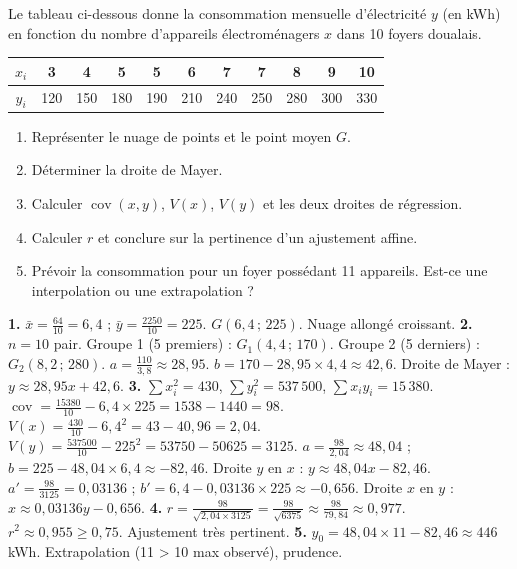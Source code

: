 \documentclass[11pt]{article}
\begin{document}
\begin{exercice}
Le tableau ci-dessous donne la consommation mensuelle d'électricité $y$ (en kWh) en fonction du nombre d'appareils électroménagers $x$ dans 10 foyers doualais.
\begin{center}
\begin{tabular}{|c|*{10}{c|}}
\hline
\rowcolor{popblueL} $x_i$ & 3 & 4 & 5 & 5 & 6 & 7 & 7 & 8 & 9 & 10 \\
\hline
$y_i$ & 120 & 150 & 180 & 190 & 210 & 240 & 250 & 280 & 300 & 330 \\
\hline
\end{tabular}
\end{center}
\begin{enumerate}
\item Représenter le nuage de points et le point moyen $G$.
\item Déterminer la droite de Mayer.
\item Calculer $\operatorname{cov}(x,y)$, $V(x)$, $V(y)$ et les deux droites de régression.
\item Calculer $r$ et conclure sur la pertinence d'un ajustement affine.
\item Prévoir la consommation pour un foyer possédant 11 appareils. Est-ce une interpolation ou une extrapolation ?
\end{enumerate}
\end{exercice}

\begin{corrige}
\textbf{1.} $\bar{x}=\frac{64}{10}=6{,}4$ ; $\bar{y}=\frac{2250}{10}=225$. $G(6{,}4\,;\,225)$. Nuage allongé croissant.
\textbf{2.} $n=10$ pair. Groupe 1 (5 premiers) : $G_1(4{,}4\,;\,170)$. Groupe 2 (5 derniers) : $G_2(8{,}2\,;\,280)$. $a=\frac{110}{3,8}\approx 28,95$. $b=170-28,95\times 4,4\approx 42,6$. Droite de Mayer : $y\approx 28,95x+42,6$.
\textbf{3.} $\sum x_i^2=430$, $\sum y_i^2=537\,500$, $\sum x_iy_i=15\,380$.
$\operatorname{cov}=\frac{15380}{10}-6,4\times 225=1538-1440=98$.
$V(x)=\frac{430}{10}-6,4^2=43-40,96=2,04$.
$V(y)=\frac{537500}{10}-225^2=53750-50625=3125$.
$a=\frac{98}{2,04}\approx 48,04$ ; $b=225-48,04\times 6,4\approx -82,46$. Droite $y$ en $x$ : $y\approx 48,04x-82,46$.
$a'=\frac{98}{3125}=0,03136$ ; $b'=6,4-0,03136\times 225\approx -0,656$. Droite $x$ en $y$ : $x\approx 0,03136y-0,656$.
\textbf{4.} $r=\frac{98}{\sqrt{2,04\times 3125}}=\frac{98}{\sqrt{6375}}\approx \frac{98}{79,84}\approx 0,977$. $r^2\approx 0,955\ge 0,75$. Ajustement très pertinent.
\textbf{5.} $y_0=48,04\times 11-82,46\approx 446$ kWh. Extrapolation (11 > 10 max observé), prudence.
\end{corrige}
\end{document}
